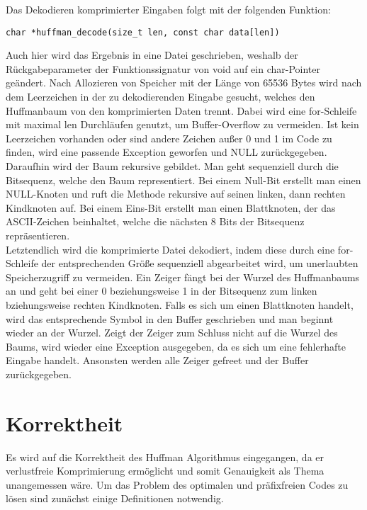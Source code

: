 \documentclass[course=erap]{aspdoc}
\begin{document}
Das Dekodieren komprimierter Eingaben folgt mit der folgenden Funktion:
\begin{center}
    \begin{lstlisting}[frame=single, framerule=0pt, numbers=none]
        char *huffman_decode(size_t len, const char data[len])
    \end{lstlisting}
\end{center}
Auch hier wird das Ergebnis in eine Datei geschrieben, weshalb der Rückgabeparameter der Funktionssignatur von void auf ein char-Pointer geändert. Nach Allozieren von Speicher mit der Länge von 65536 Bytes wird nach dem Leerzeichen in der zu dekodierenden Eingabe gesucht, welches den Huffmanbaum von den komprimierten Daten trennt. Dabei wird eine for-Schleife mit maximal len Durchläufen genutzt, um Buffer-Overflow%
zu vermeiden. Ist kein Leerzeichen vorhanden oder sind andere Zeichen außer 0 und 1 im Code zu finden, wird eine passende Exception geworfen und NULL zurückgegeben.\\
Daraufhin wird der Baum rekursive gebildet. Man geht sequenziell durch die Bitsequenz, welche den Baum representiert. Bei einem Null-Bit erstellt man einen NULL-Knoten und ruft die Methode rekursive auf seinen linken, dann rechten Kindknoten auf. Bei einem Eins-Bit erstellt man einen Blattknoten, der das ASCII-Zeichen beinhaltet, welche die nächsten 8 Bits der Bitsequenz repräsentieren.\\
Letztendlich wird die komprimierte Datei dekodiert, indem diese durch eine for-Schleife der entsprechenden Größe sequenziell abgearbeitet wird, um unerlaubten Speicherzugriff zu vermeiden. Ein Zeiger fängt bei der Wurzel des Huffmanbaums an und geht bei einer 0 beziehungsweise 1 in der Bitsequenz zum linken bziehungsweise rechten Kindknoten. Falls es sich um einen Blattknoten handelt, wird das entsprechende Symbol in den Buffer geschrieben und man beginnt wieder an der Wurzel. Zeigt der Zeiger zum Schluss nicht auf die Wurzel des Baums, wird wieder eine Exception ausgegeben, da es sich um eine fehlerhafte Eingabe handelt.
Ansonsten werden alle Zeiger gefreet und der Buffer zurückgegeben.


\section{Korrektheit}

Es wird auf die Korrektheit des Huffman Algorithmus eingegangen, da er verlustfreie Komprimierung ermöglicht und somit Genauigkeit als Thema unangemessen wäre.
Um das Problem des optimalen und präfixfreien Codes zu lösen sind zunächst einige Definitionen notwendig.
\end{document}

